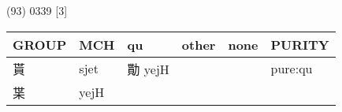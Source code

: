 \documentclass[14pt,a4paper]{scrartcl}
\begin{document}
(93) 0339 {[}3{]}

\begin{longtable}[c]{@{}llllll@{}}
\toprule
\begin{minipage}[b]{0.14\columnwidth}\raggedright\strut
GROUP
\strut\end{minipage} &
\begin{minipage}[b]{0.14\columnwidth}\raggedright\strut
MCH
\strut\end{minipage} &
\begin{minipage}[b]{0.14\columnwidth}\raggedright\strut
qu
\strut\end{minipage} &
\begin{minipage}[b]{0.14\columnwidth}\raggedright\strut
other
\strut\end{minipage} &
\begin{minipage}[b]{0.14\columnwidth}\raggedright\strut
none
\strut\end{minipage} &
\begin{minipage}[b]{0.14\columnwidth}\raggedright\strut
PURITY
\strut\end{minipage}\tabularnewline
\midrule
\endhead
\begin{minipage}[t]{0.14\columnwidth}\raggedright\strut
貰
\strut\end{minipage} &
\begin{minipage}[t]{0.14\columnwidth}\raggedright\strut
sjet
\strut\end{minipage} &
\begin{minipage}[t]{0.14\columnwidth}\raggedright\strut
勩 yejH
\strut\end{minipage} &
\begin{minipage}[t]{0.14\columnwidth}\raggedright\strut
\strut\end{minipage} &
\begin{minipage}[t]{0.14\columnwidth}\raggedright\strut
\strut\end{minipage} &
\begin{minipage}[t]{0.14\columnwidth}\raggedright\strut
pure:qu
\strut\end{minipage}\tabularnewline
\begin{minipage}[t]{0.14\columnwidth}\raggedright\strut
枼
\strut\end{minipage} &
\begin{minipage}[t]{0.14\columnwidth}\raggedright\strut
yejH
\strut\end{minipage} &
\begin{minipage}[t]{0.14\columnwidth}\raggedright\strut
\strut\end{minipage} &

\end{longtable}
\end{document}
